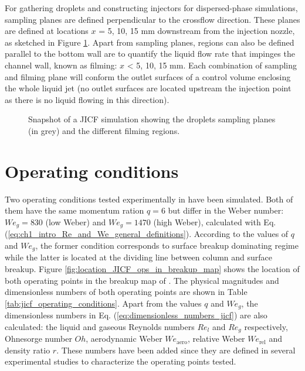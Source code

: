 For gathering droplets and constructing injectors for dispersed-phase simulations, sampling planes are defined perpendicular to the crossflow direction. These planes are defined at locations $x$ = 5, 10, 15 mm downstream from the injection nozzle, as sketched in Figure \ref{fig:jicf_interior_boundaries_surface_measurements}. Apart from sampling planes, regions can also be defined parallel to the bottom wall are to quantify the liquid flow rate that impinges the channel wall,
known as filming: $x$ < 5, 10, 15 mm. Each combination of sampling and filming plane will conform
the outlet surfaces of a control volume enclosing the whole liquid jet (no outlet surfaces are located upstream
the injection point as there is no liquid flowing in this direction).

\begin{figure}[ht]
     \centering
     \caption{Snapshot of a JICF simulation showing the droplets sampling planes (in grey) and the different filming regions.}
      \label{fig:jicf_interior_boundaries_surface_measurements}
\end{figure}



\section{Operating conditions}
\label{sec:JICF_SPS_OPs_detailed}

Two operating conditions tested experimentally in  have been simulated. Both of them have the same momentum ration $q = 6$ but differ in the Weber number: $We_g = 830$ (low Weber) and $We_g = 1470$ (high Weber), calculated with Eq. (\ref{eq:ch1_intro_Re_and_We_general_definitions}). According to the values of $q$ and $We_g$, the former condition corresponds to surface breakup dominating regime while the latter is located at the dividing line between column and surface breakup. Figure \ref{fig:location_JICF_ops_in_breakup_map} shows the location of both operating points in the breakup map of \citeColor[wu_breakup_1997]. The physical magnitudes and dimensionless numbers of both operating points are shown in Table \ref{tab:jicf_operating_conditions}. Apart from the values $q$ and $We_g$, the dimensionless numbers in  Eq. (\ref{eq:dimensionless_numbers_jicf}) are also calculated: the liquid and gaseous Reynolds numbers $Re_l$ and $Re_g$ respectively, Ohnesorge number $Oh$, aerodynamic Weber $We_\mathrm{aero}$, relative Weber $We_\mathrm{rel}$ and density ratio $r$. These numbers have been added since they are defined in several experimental studies  to characterize the operating points tested. 

